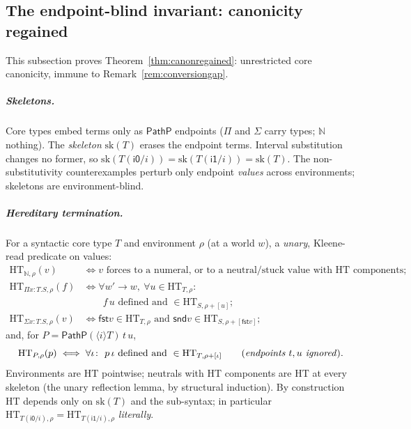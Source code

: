 \documentclass{lmcs}
\providecommand{\fst}{}\renewcommand{\fst}{\mathsf{fst}}
\providecommand{\snd}{}\renewcommand{\snd}{\mathsf{snd}}
\newcommand{\ii}{\mathsf{i1}}
\newcommand{\io}{\mathsf{i0}}
\begin{document}
\subsection{The endpoint-blind invariant: canonicity regained}
\label{app:htrepair}

This subsection proves Theorem~\ref{thm:canonregained}: unrestricted
core canonicity, immune to Remark~\ref{rem:conversiongap}.

\subparagraph*{Skeletons.}  Core types embed terms only as
$\mathsf{PathP}$ endpoints ($\Pi$ and $\Sigma$ carry types; $\mathbb{N}$
nothing).  The \emph{skeleton} $\mathrm{sk}(T)$ erases the endpoint
terms.  Interval substitution changes no former, so
$\mathrm{sk}(T(\io/i)) = \mathrm{sk}(T(\ii/i)) = \mathrm{sk}(T)$.
The non-substitutivity counterexamples perturb only endpoint
\emph{values} across environments; skeletons are environment-blind.

\subparagraph*{Hereditary termination.}  For a syntactic core type
$T$ and environment $\rho$ (at a world $w$), a \emph{unary},
Kleene-read predicate on values:
\begin{align*}
  \mathrm{HT}_{\mathbb{N},\rho}(v) &\iff
    v \text{ forces to a numeral, or to a neutral/stuck value with }
    \mathrm{HT} \text{ components};\\
  \mathrm{HT}_{\Pi x:T.S,\rho}(f) &\iff
    \forall w' \to w,\ \forall u \in \mathrm{HT}_{T,\rho}\colon\\
    &\qquad
    f\,u \text{ defined and } \in \mathrm{HT}_{S,\rho+[u]};\\
  \mathrm{HT}_{\Sigma x:T.S,\rho}(v) &\iff
    \fst v \in \mathrm{HT}_{T,\rho} \text{ and }
    \snd v \in \mathrm{HT}_{S,\rho+[\fst v]};
\end{align*}
and, for $P = \mathsf{PathP}(\langle i \rangle T)\,t\,u$,
\[
  \mathrm{HT}_{P,\rho}(p) \iff
  \forall \iota\colon\ p\,\iota \text{ defined and }
  \in \mathrm{HT}_{T,\rho+[\iota]}
  \qquad(\text{\emph{endpoints $t,u$ ignored}}).
\]
Environments are $\mathrm{HT}$ pointwise; neutrals with
$\mathrm{HT}$ components are $\mathrm{HT}$ at every skeleton (the
unary reflection lemma, by structural induction).  By construction
$\mathrm{HT}$ depends only on $\mathrm{sk}(T)$ and the sub-syntax;
in particular
$\mathrm{HT}_{T(\io/i),\rho} = \mathrm{HT}_{T(\ii/i),\rho}$
\emph{literally}.
\end{document}
